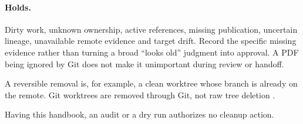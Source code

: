 \paragraph{Holds.} Dirty work, unknown ownership, active references, missing publication,
uncertain lineage, unavailable remote evidence and target drift. Record the specific
missing evidence rather than turning a broad ``looks old'' judgment into approval. A PDF
being ignored by Git does not make it unimportant during review or handoff.

A reversible removal is, for example, a clean worktree whose branch is already on the
remote. Git worktrees are removed through Git, not raw tree deletion \cite[Approval;
  Restore]{skill:lifecycle}.

\begin{rulebox}
  Having this handbook, an audit or a dry run authorizes no cleanup action.
\end{rulebox}
